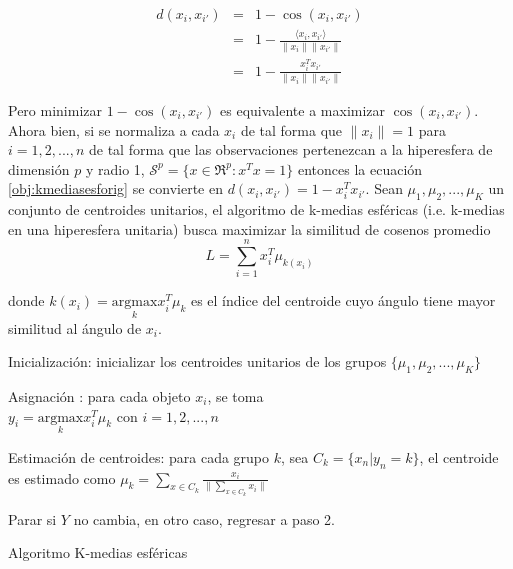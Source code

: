 \begin{eqnarray}\label{obj:kmediasesforig}
  d(x_{i},x_{i'})& = &1- \cos(x_{i},x_{i'}) \\ \nonumber
  &=& 1-\frac{\langle x_{i},x_{i'}\rangle}{\|x_{i}\|\|x_{i'}\|} \\ \nonumber
  &=& 1-\frac{x_{i}^Tx_{i'}}{\|x_{i}\|\|x_{i'}\|}
\end{eqnarray}

Pero minimizar $1- \cos(x_{i},x_{i'})$ es equivalente a maximizar $\cos(x_{i},x_{i'})$. Ahora bien, si se normaliza a cada $x_{i}$ de tal forma que $\|x_{i}\|=1$ para $i = 1,2,...,n$ de tal forma que las observaciones pertenezcan a la hiperesfera de dimensión $p$ y radio 1, $\mathcal{S}^p =\lbrace x \in \Re^{p} : x^T x=1 \rbrace $ entonces la ecuación \ref{obj:kmediasesforig} se convierte en $d(x_{i},x_{i'}) = 1- x_{i}^Tx_{i'}$. Sean ${\mu_{1},\mu_{2},...,\mu_{K}}$ un conjunto de centroides unitarios, el algoritmo de k-medias esféricas (i.e. k-medias en una hiperesfera unitaria) busca maximizar la similitud de cosenos promedio 
\begin{equation}\label{eq:kmediasesf}
L = \sum_{i=1}^{n} x_{i}^T \mu_{k(x_{i})} 
\end{equation}

donde $k(x_{i})=\underset{k}{\textrm{argmax}} x_{i}^T \mu_{k}  $ es el índice del centroide cuyo ángulo tiene mayor similitud al ángulo de $x_{i}$.

\ssp
\begin{algorithm}
  \SetAlgoNoLine
  \DontPrintSemicolon
  Inicialización: inicializar los centroides unitarios de los grupos  $\{\mu_{1},\mu_{2},...,\mu_{K}\}$

  Asignación : para cada objeto $x_{i}$, se toma \\ $y_{i}=\underset{k}{\textrm{argmax}}  x_{i}^T \mu_{k}  $ con $i = 1,2,...,n$
 
  Estimación de centroides: para cada grupo $k$, sea $C_{k}=\{x_{n} | y_{n}=k\}$, el centroide es estimado como $\mu_{k}= \sum_{x \in C_{k}} \frac{x_{i}}{\| \sum_{x \in C_{k}} x_{i}\|}$
  
  Parar si $Y$ no cambia, en otro caso, regresar a paso 2.
  \caption{Algoritmo K-medias esféricas\label{Kmediasesf}}
\end{algorithm}
\dsp

